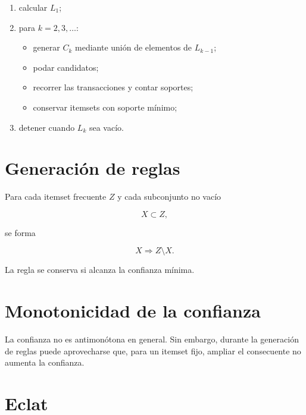 \documentclass[
  spanish,
  10.5pt,
  letterpaper,
  DIV=11,
  numbers=noendperiod,
  oneside,
  open=any]{scrreprt}
\providecommand{\tightlist}{%
  \setlength{\itemsep}{0pt}\setlength{\parskip}{0pt}}
\theoremstyle{definition}
\theoremstyle{definition}
\theoremstyle{plain}
\theoremstyle{remark}
\begin{document}

\begin{enumerate}
\def\labelenumi{\arabic{enumi}.}
\tightlist
\item
  calcular \(L_1\);
\item
  para \(k=2,3,\ldots\):

  \begin{itemize}
  \tightlist
  \item
    generar \(C_k\) mediante unión de elementos de \(L_{k-1}\);
  \item
    podar candidatos;
  \item
    recorrer las transacciones y contar soportes;
  \item
    conservar itemsets con soporte mínimo;
  \end{itemize}
\item
  detener cuando \(L_k\) sea vacío.
\end{enumerate}

\section*{Generación de reglas}\label{generaciuxf3n-de-reglas}


Para cada itemset frecuente \(Z\) y cada subconjunto no vacío

\[
X\subset Z,
\]

se forma

\[
X\Rightarrow Z\setminus X.
\]

La regla se conserva si alcanza la confianza mínima.

\section*{Monotonicidad de la
confianza}\label{monotonicidad-de-la-confianza}


La confianza no es antimonótona en general. Sin embargo, durante la
generación de reglas puede aprovecharse que, para un itemset fijo,
ampliar el consecuente no aumenta la confianza.

\section*{Eclat}\label{eclat}
\end{document}
